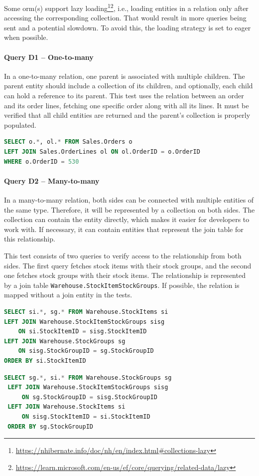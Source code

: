 Some \acrshort{orm}(s) support lazy loading\footnote{\url{https://nhibernate.info/doc/nh/en/index.html\#collections-lazy}}\footnote{\url{https://learn.microsoft.com/en-us/ef/core/querying/related-data/lazy}}, i.e., loading entities in a relation only after accessing the corresponding collection. That would result in more queries being sent and a potential slowdown. To avoid this, the loading strategy is set to eager when possible.

\paragraph{Query D1 -- One-to-many}
\label{query:d1}
In a one-to-many relation, one parent is associated with multiple children. The parent entity should include a collection of its children, and optionally, each child can hold a reference to its parent. This test uses the relation between an order and its order lines, fetching one specific order along with all its lines.
It must be verified that all child entities are returned and the parent’s collection is properly populated.

\begin{lstlisting}[language=SQL]
SELECT o.*, ol.* FROM Sales.Orders o
LEFT JOIN Sales.OrderLines ol ON ol.OrderID = o.OrderID
WHERE o.OrderID = 530
\end{lstlisting}

\paragraph{Query D2 -- Many-to-many}
\label{query:d2}
In a many-to-many relation, both sides can be connected with multiple entities of the same type. Therefore, it will be represented by a collection on both sides. The collection can contain the entity directly, which makes it easier for developers to work with. If necessary, it can contain entities that represent the join table for this relationship.

This test consists of two queries to verify access to the relationship from both sides. The first query fetches stock items with their stock groups, and the second one fetches stock groups with their stock items. The relationship is represented by a join table \texttt{Warehouse.StockItemStockGroups}. If possible, the relation is mapped without a join entity in the tests.

\begin{lstlisting}[language=SQL]
SELECT si.*, sg.* FROM Warehouse.StockItems si
LEFT JOIN Warehouse.StockItemStockGroups sisg
    ON si.StockItemID = sisg.StockItemID
LEFT JOIN Warehouse.StockGroups sg
    ON sisg.StockGroupID = sg.StockGroupID
ORDER BY si.StockItemID
\end{lstlisting}
\begin{lstlisting}[language=SQL]
 SELECT sg.*, si.* FROM Warehouse.StockGroups sg
 LEFT JOIN Warehouse.StockItemStockGroups sisg
     ON sg.StockGroupID = sisg.StockGroupID
 LEFT JOIN Warehouse.StockItems si
     ON sisg.StockItemID = si.StockItemID
 ORDER BY sg.StockGroupID
\end{lstlisting}

